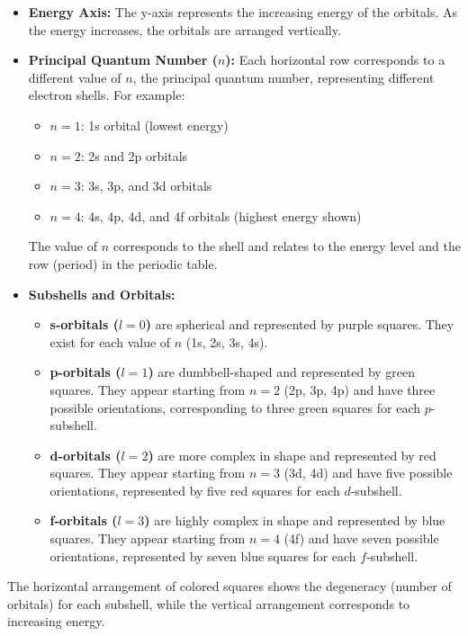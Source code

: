 \documentclass{report}
\begin{document}
\begin{itemize}
	\item \textbf{Energy Axis:} The y-axis represents the increasing energy of the orbitals. As the energy increases, the orbitals are arranged vertically.
	\item \textbf{Principal Quantum Number ($n$):} Each horizontal row corresponds to a different value of $n$, the principal quantum number, representing different electron shells. For example:
	      \begin{itemize}
		      \item $n=1$: 1s orbital (lowest energy)
		      \item $n=2$: 2s and 2p orbitals
		      \item $n=3$: 3s, 3p, and 3d orbitals
		      \item $n=4$: 4s, 4p, 4d, and 4f orbitals (highest energy shown)
	      \end{itemize}
	      The value of $n$ corresponds to the shell and relates to the energy level and the row (period) in the periodic table.
	\item \textbf{Subshells and Orbitals:}
	      \begin{itemize}
		      \item \textbf{s-orbitals ($l=0$)} are spherical and represented by purple squares. They exist for each value of $n$ (1s, 2s, 3s, 4s).
		      \item \textbf{p-orbitals ($l=1$)} are dumbbell-shaped and represented by green squares. They appear starting from $n=2$ (2p, 3p, 4p) and have three possible orientations, corresponding to three green squares for each $p$-subshell.
		      \item \textbf{d-orbitals ($l=2$)} are more complex in shape and represented by red squares. They appear starting from $n=3$ (3d, 4d) and have five possible orientations, represented by five red squares for each $d$-subshell.
		      \item \textbf{f-orbitals ($l=3$)} are highly complex in shape and represented by blue squares. They appear starting from $n=4$ (4f) and have seven possible orientations, represented by seven blue squares for each $f$-subshell.
	      \end{itemize}
\end{itemize}

The horizontal arrangement of colored squares shows the degeneracy (number of orbitals) for each subshell, while the vertical arrangement corresponds to increasing energy.
\end{document}
